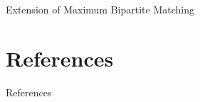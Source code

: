 \documentclass{beamer}
\begin{document}
\begin{frame}{Extension of Maximum Bipartite Matching}
\begin{tikzpicture}
        \end{tikzpicture}
    
    
\end{frame}

\section{References}

\begin{frame}{References}


\end{frame}
\end{document}
